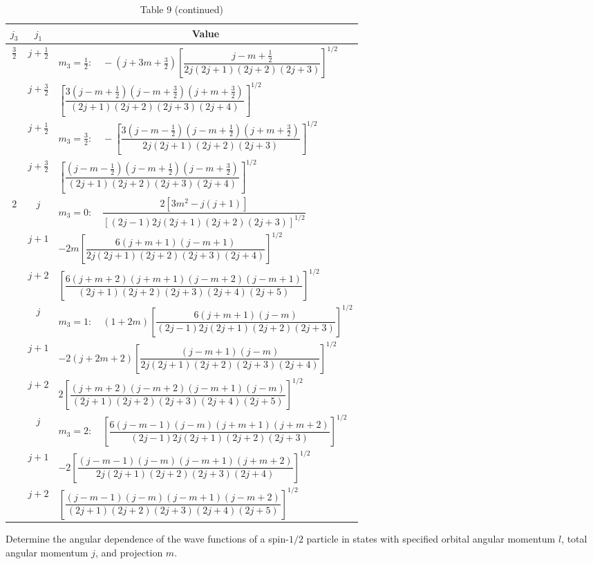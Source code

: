\begin{table}[htbp]
\centering\scriptsize
\caption*{Table 9 (continued)}
\renewcommand{\arraystretch}{1.55}
\begin{tabular}{@{}c c l@{}}
\toprule
$j_3$ & $j_1$ & \multicolumn{1}{c}{Value}\\
\midrule
$\frac32$ & $j+\frac12$ & $m_3=\frac12:\quad -(j+3m+\frac32)\left[\dfrac{j-m+\frac12}{2j(2j+1)(2j+2)(2j+3)}\right]^{1/2}$\\
&$j+\frac32$&$\left[\dfrac{3(j-m+\frac12)(j-m+\frac32)(j+m+\frac32)}{(2j+1)(2j+2)(2j+3)(2j+4)}\right]^{1/2}$\\
&$j+\frac12$&$m_3=\frac32:\quad-\left[\dfrac{3(j-m-\frac12)(j-m+\frac12)(j+m+\frac32)}{2j(2j+1)(2j+2)(2j+3)}\right]^{1/2}$\\
&$j+\frac32$&$\left[\dfrac{(j-m-\frac12)(j-m+\frac12)(j-m+\frac32)}{(2j+1)(2j+2)(2j+3)(2j+4)}\right]^{1/2}$\\
\midrule
$2$&$j$&$m_3=0:\quad\dfrac{2[3m^2-j(j+1)]}{[(2j-1)2j(2j+1)(2j+2)(2j+3)]^{1/2}}$\\
&$j+1$&$-2m\left[\dfrac{6(j+m+1)(j-m+1)}{2j(2j+1)(2j+2)(2j+3)(2j+4)}\right]^{1/2}$\\
&$j+2$&$\left[\dfrac{6(j+m+2)(j+m+1)(j-m+2)(j-m+1)}{(2j+1)(2j+2)(2j+3)(2j+4)(2j+5)}\right]^{1/2}$\\
&$j$&$m_3=1:\quad(1+2m)\left[\dfrac{6(j+m+1)(j-m)}{(2j-1)2j(2j+1)(2j+2)(2j+3)}\right]^{1/2}$\\
&$j+1$&$-2(j+2m+2)\left[\dfrac{(j-m+1)(j-m)}{2j(2j+1)(2j+2)(2j+3)(2j+4)}\right]^{1/2}$\\
&$j+2$&$2\left[\dfrac{(j+m+2)(j-m+2)(j-m+1)(j-m)}{(2j+1)(2j+2)(2j+3)(2j+4)(2j+5)}\right]^{1/2}$\\
&$j$&$m_3=2:\quad\left[\dfrac{6(j-m-1)(j-m)(j+m+1)(j+m+2)}{(2j-1)2j(2j+1)(2j+2)(2j+3)}\right]^{1/2}$\\
&$j+1$&$-2\left[\dfrac{(j-m-1)(j-m)(j-m+1)(j+m+2)}{2j(2j+1)(2j+2)(2j+3)(2j+4)}\right]^{1/2}$\\
&$j+2$&$\left[\dfrac{(j-m-1)(j-m)(j-m+1)(j-m+2)}{(2j+1)(2j+2)(2j+3)(2j+4)(2j+5)}\right]^{1/2}$\\
\bottomrule
\end{tabular}
\end{table}

\ProblemHeading

Determine the angular dependence of the wave functions of a spin-$1/2$ particle in states with specified orbital angular momentum $l$, total angular momentum $j$, and projection $m$.

